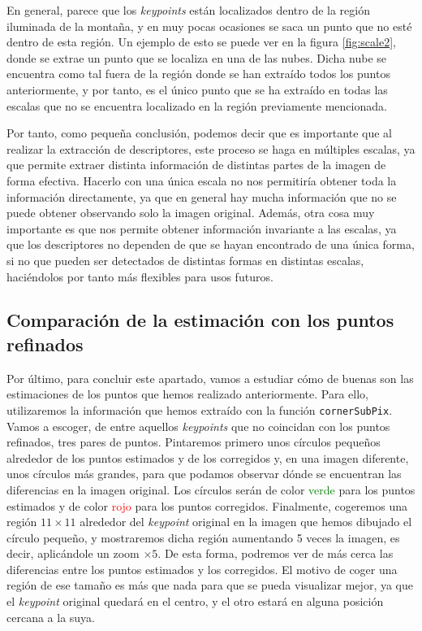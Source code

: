 \documentclass[11pt,a4paper]{article}
\begin{document}
En general, parece que los \textit{keypoints} están localizados dentro de la
región iluminada de la montaña, y en muy pocas ocasiones se saca un punto que no esté
dentro de esta región. Un ejemplo de esto se puede ver en la figura \ref{fig:scale2}, donde
se extrae un punto que se localiza en una de las nubes. Dicha nube se encuentra como tal
fuera de la región donde se han extraído todos los puntos anteriormente, y por tanto, es el
único punto que se ha extraído en todas las escalas que no se encuentra localizado en la región
previamente mencionada. 

Por tanto, como pequeña conclusión, podemos decir que es importante que al realizar
la extracción de descriptores, este proceso se haga en múltiples escalas, ya que
permite extraer distinta información de distintas partes de la imagen de forma efectiva.
Hacerlo con una única escala no nos permitiría obtener toda la información directamente,
ya que en general hay mucha información que no se puede obtener observando
solo la imagen original. Además, otra cosa muy importante es que nos permite
obtener información invariante a las escalas, ya que los descriptores no dependen de
que se hayan encontrado de una única forma, si no que pueden ser detectados de distintas
formas en distintas escalas, haciéndolos por tanto más flexibles para usos futuros.

\subsection{Comparación de la estimación con los puntos refinados}

Por último, para concluir este apartado, vamos a estudiar cómo de buenas son las
estimaciones de los puntos que hemos realizado anteriormente. Para ello, utilizaremos
la información que hemos extraído con la función \texttt{cornerSubPix}. Vamos a
escoger, de entre aquellos \textit{keypoints} que no coincidan con los puntos refinados,
tres pares de puntos. Pintaremos primero unos círculos pequeños alrededor de los puntos
estimados y de los corregidos y, en una imagen diferente, unos círculos más grandes,
para que podamos observar dónde se encuentran las diferencias en la imagen original. Los círculos
serán de color \textcolor{green}{verde} para los puntos estimados y de color
\textcolor{red}{rojo} para los puntos corregidos.
Finalmente, cogeremos una región $11 \times 11$ alrededor del \textit{keypoint}
original en la imagen que hemos dibujado el círculo pequeño, y mostraremos dicha región
aumentando 5 veces la imagen, es decir, aplicándole un zoom $\times 5$. De esta forma, podremos
ver de más cerca las diferencias entre los puntos estimados y los corregidos. El motivo de coger
una región de ese tamaño es más que nada para que se pueda visualizar mejor, ya que el
\textit{keypoint} original quedará en el centro, y el otro estará en alguna posición cercana a la suya.
\end{document}
